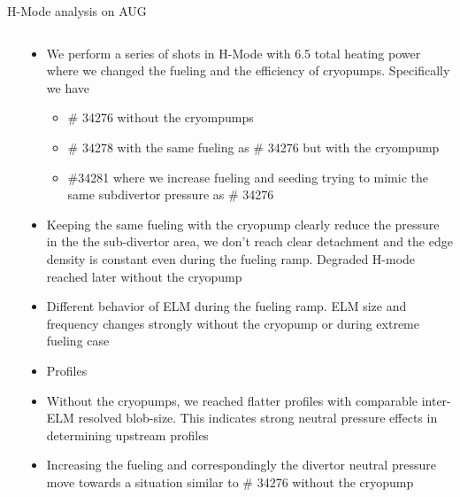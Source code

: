 \documentclass[10pt, compress]{beamer}
\newcommand\Fontvi{\fontsize{8}{7.2}\selectfont}
\begin{document}
\begin{frame}{H-Mode analysis on AUG}
    \Fontvi
  \vspace{-1cm}
  \begin{columns}
  \begin{column}{0.55\textwidth}
  \end{column}
  \begin{column}{0.45\textwidth}
    \begin{itemize}
    \item<1|only@1> We perform a series of shots in H-Mode with 6.5
      total heating power where we changed the fueling and the
      efficiency of cryopumps. Specifically we have
      \begin{itemize}
        \item<1|only@1>\textcolor{colorA}{\# 34276 without the
            cryompumps}
        \item<1|only@1> \textcolor{colorB}{\# 34278 with the same
            fueling as \# 34276 but with the cryompump}
        \item<1|only@1> \textcolor{colorC}{\#34281 where we increase
            fueling and seeding trying to mimic the same subdivertor
            pressure as \# 34276}
      \end{itemize}
    \item<1|only@1> Keeping the same fueling with the cryopump clearly
      reduce the pressure in the the sub-divertor area, we don't reach
      clear detachment and the edge density is constant even during
      the fueling ramp. Degraded H-mode reached later without the cryopump
      
    \item<2|only@2> Different behavior of ELM during the fueling
      ramp. ELM size and frequency changes strongly without the
      cryopump or during extreme fueling case
    \item<3|only@3> Profiles
    \item<4|only@4> Without the cryopumps, we reached flatter
         profiles with comparable inter-ELM resolved blob-size. This
         indicates strong neutral pressure effects in determining
         upstream profiles
    \item<5|only@5> Increasing the fueling and correspondingly the
      divertor neutral pressure move towards a situation similar to
      \# 34276 without the cryopump
      \end{itemize}
  \end{column}
\end{columns}
\end{frame}
\end{document}
